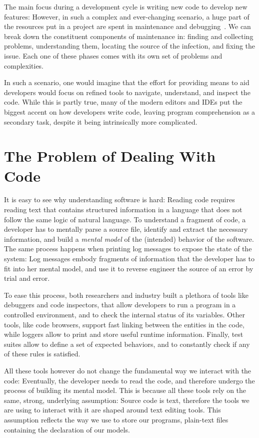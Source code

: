 The main focus during a development cycle is writing new code to develop new features: However, in such a complex and ever-changing scenario, a huge part of the resources put in a project are spent in maintenance and debugging~\cite{Corb1989,Fjel1983,Zelk1979,Mine2015b}.
We can break down the constituent components of maintenance in: finding and collecting problems, understanding them, locating the source of the infection, and fixing the issue.
Each one of these phases comes with its own set of problems and complexities.

In such a scenario, one would imagine that the effort for providing means to aid developers would focus on refined tools to navigate, understand, and inspect the code.
While this is partly true, many of the modern editors and IDEs put the biggest accent on how developers write code, leaving program comprehension as a secondary task, despite it being intrinsically more complicated.


\section{The Problem of Dealing With Code}

It is easy to see why understanding software is hard: Reading code requires reading text that contains structured information in a language that does not follow the same logic of natural language. To understand a fragment of code, a developer has to mentally parse a source file, identify and extract the necessary information, and build a \emph{mental model} of the (intended) behavior of the software. The same process happens when printing log messages to expose the state of the system: Log messages embody fragments of information that the developer has to fit into her mental model, and use it to reverse engineer the source of an error by trial and error.

To ease this process, both researchers and industry built a plethora of tools like debuggers and code inspectors, that allow developers to run a program in a controlled environment, and to check the internal status of its variables.
Other tools, like code browsers, support fast linking between the entities in the code, while loggers allow to print and store useful runtime information.
Finally, test suites allow to define a set of expected behaviors, and to constantly check if any of these rules is satisfied.

All these tools however do not change the fundamental way we interact with the code: Eventually, the developer needs to read the code, and therefore undergo the process of building its mental model.
This is because all these tools rely on the same, strong, underlying assumption: Source code is text, therefore the tools we are using to interact with it are shaped around text editing tools.
This assumption reflects the way we use to store our programs, \ie plain-text files containing the declaration of our models.

